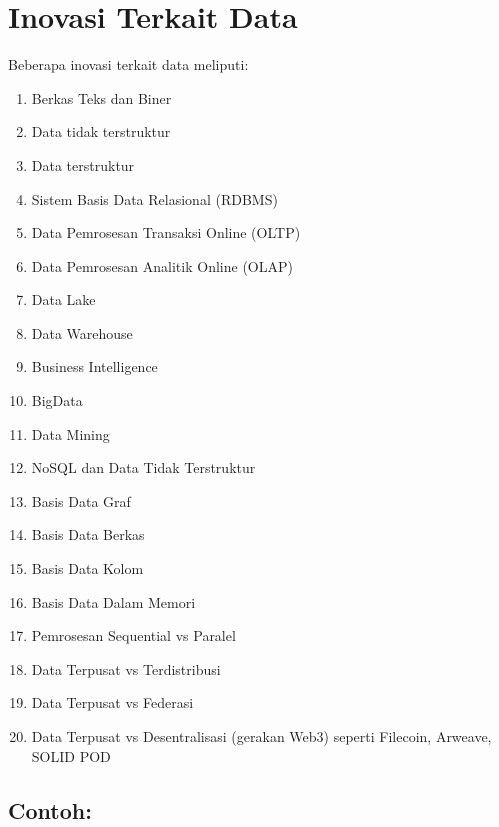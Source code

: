 \section{Inovasi Terkait Data}
Beberapa inovasi terkait data meliputi:

	\begin{multicols}{2}
		\begin{enumerate}
			\item Berkas Teks dan Biner
			\item Data tidak terstruktur
			\item Data terstruktur
			\item Sistem Basis Data Relasional (RDBMS)
			\item Data Pemrosesan Transaksi Online (OLTP)
			\item Data Pemrosesan Analitik Online (OLAP)
			\item Data Lake
			\item Data Warehouse
			\item Business Intelligence
			\item BigData
			\item Data Mining
			\item NoSQL dan Data Tidak Terstruktur
			\item Basis Data Graf
			\item Basis Data Berkas
			\item Basis Data Kolom
			\item Basis Data Dalam Memori
			\item Pemrosesan Sequential vs Paralel
			\item Data Terpusat vs Terdistribusi
			\item Data Terpusat vs Federasi
			\item Data Terpusat vs Desentralisasi (gerakan Web3) seperti Filecoin, Arweave, SOLID POD
		\end{enumerate}
	\end{multicols}


\subsection*{Contoh:}

